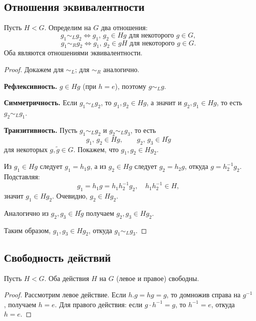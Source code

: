 \subsection*{Отношения эквивалентности}

\begin{stmt}
    Пусть $H < G$. Определим на $G$ два отношения:
    \[
        g_1 \sim_L g_2 \iff g_1,\, g_2 \in Hg \text{ для некоторого } g \in G,
    \]
    \[
        g_1 \sim_R g_2 \iff g_1,\, g_2 \in gH \text{ для некоторого } g \in G.
    \]
    Оба являются отношениями эквивалентности.

    \begin{proof}
        Докажем для $\sim_L$; для $\sim_R$ аналогично.

        \textbf{Рефлексивность.} $g \in Hg$ (при $h = e$), поэтому $g \sim_L g$.

        \textbf{Симметричность.} Если $g_1 \sim_L g_2$, то $g_1, g_2 \in Hg$, а значит и $g_2, g_1 \in Hg$, то есть $g_2 \sim_L g_1$.

        \textbf{Транзитивность.} Пусть $g_1 \sim_L g_2$ и $g_2 \sim_L g_3$, то есть
        \[
            g_1,\, g_2 \in Hg, \qquad g_2,\, g_3 \in H\widetilde{g}
        \]
        для некоторых $g, \widetilde{g} \in G$. Покажем, что $g_1, g_2 \in Hg_2$.

        Из $g_1 \in Hg$ следует $g_1 = h_1 g$, а из $g_2 \in Hg$ следует $g_2 = h_2 g$, откуда $g = h_2^{-1} g_2$. Подставляя:
        \[
            g_1 = h_1 g = h_1 h_2^{-1} g_2, \quad h_1 h_2^{-1} \in H,
        \]
        значит $g_1 \in Hg_2$. Очевидно, $g_2 \in Hg_2$.

        Аналогично из $g_2, g_3 \in H\widetilde{g}$ получаем $g_2, g_3 \in Hg_2$.

        Таким образом, $g_1, g_3 \in Hg_2$, откуда $g_1 \sim_L g_3$.
    \end{proof}
\end{stmt}

\subsection*{Свободность действий}

\begin{stmt}
    Пусть $H < G$. Оба действия $H$ на $G$ (левое и правое) свободны.

    \begin{proof}
        Рассмотрим левое действие. Если $h . g = hg = g$, то домножив справа на $g^{-1}$, получаем $h = e$.
        Для правого действия: если $g \cdot h^{-1} = g$, то $h^{-1} = e$, откуда $h = e$.
    \end{proof}
\end{stmt}


